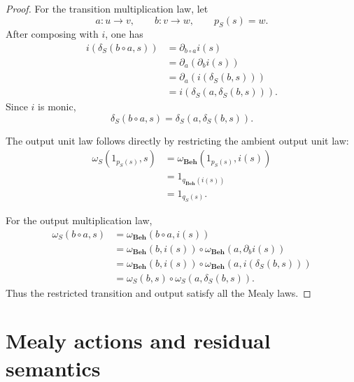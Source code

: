 \begin{proof}
    For the transition multiplication law, let
    \[
        a:u\to v,
        \qquad
        b:v\to w,
        \qquad
        p_S(s)=w.
    \]
    After composing with \(i\), one has
    \[
        \begin{aligned}
            i(\delta_S(b\circ a,s))
            &=
            \partial_{b\circ a}i(s)
            \\
            &=
            \partial_a(\partial_bi(s))
            \\
            &=
            \partial_a(i(\delta_S(b,s)))
            \\
            &=
            i(\delta_S(a,\delta_S(b,s))).
        \end{aligned}
    \]
    Since \(i\) is monic,
    \[
        \delta_S(b\circ a,s)
        =
        \delta_S(a,\delta_S(b,s)).
    \]

    The output unit law follows directly by restricting the ambient output
    unit law:
    \[
        \begin{aligned}
            \omega_S(1_{p_S(s)},s)
            &=
            \omega_{\mathbf{Beh}}(1_{p_S(s)},i(s))
            \\
            &=
            1_{q_{\mathbf{Beh}}(i(s))}
            \\
            &=
            1_{q_S(s)}.
        \end{aligned}
    \]

    For the output multiplication law,
    \[
        \begin{aligned}
            \omega_S(b\circ a,s)
            &=
            \omega_{\mathbf{Beh}}(b\circ a,i(s))
            \\
            &=
            \omega_{\mathbf{Beh}}(b,i(s))
            \circ
            \omega_{\mathbf{Beh}}(a,\partial_bi(s))
            \\
            &=
            \omega_{\mathbf{Beh}}(b,i(s))
            \circ
            \omega_{\mathbf{Beh}}
            (a,i(\delta_S(b,s)))
            \\
            &=
            \omega_S(b,s)
            \circ
            \omega_S(a,\delta_S(b,s)).
        \end{aligned}
    \]
    Thus the restricted transition and output satisfy all the Mealy laws.
\end{proof}

\section{Mealy actions and residual semantics}
\label{sec:mealy-actions-residual-semantics}

